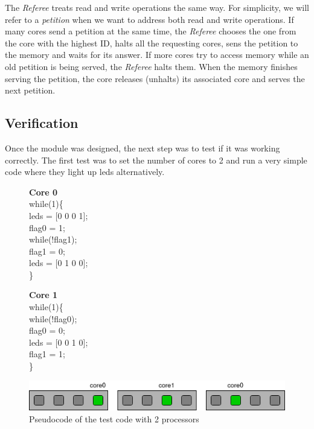 The \textit{Referee} treats read and write operations the same way. 
For simplicity, we will refer to a \textit{petition} when we want to address both read and write operations.
If many cores send a petition at the same time, the \textit{Referee} chooses the one from the core with the highest ID, halts all the requesting cores, sens the petition to the memory and waits for its answer. 
If more cores try to access memory while an old petition is being served, the \textit{Referee} halts them.
When the memory finishes serving the petition, the core releases (unhalts) its associated core and serves the next petition.

\subsection{Verification}

Once the module was designed, the next step was to test if it was working correctly.
The first test was to set the number of cores to 2 and run a very simple code where they light up leds alternatively.

\begin{figure}[htbp]
\centering
\begin{minipage}[t][4cm][t]{4cm}
\textbf{Core 0}\\
while(1)\{\\
\hspace*{1cm}leds = [0 0 0 1];\\
\hspace*{1cm}flag0 = 1;\\
\hspace*{1cm}while(!flag1);\\
\hspace*{1cm}flag1 = 0;\\
\hspace*{1cm}leds = [0 1 0 0];\\
\}
\end{minipage}\hspace{3cm}
\begin{minipage}[t][4cm][t]{4cm}
\textbf{Core 1}\\
while(1)\{\\
\hspace*{1cm} while(!flag0);\\
\hspace*{1cm}flag0 = 0;\\
\hspace*{1cm}leds = [0 0 1 0];\\
\hspace*{1cm}flag1 = 1;\\
\}
\end{minipage}%
\label{2led-code}
\includegraphics[width=.6\textwidth]{images/leds2_fig.png}
\caption{Pseudocode of the test code with 2 processors}
\end{figure}


